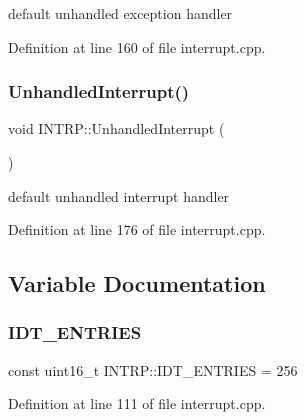 default unhandled exception handler 



Definition at line 160 of file interrupt.\+cpp.

\mbox{\label{namespace_i_n_t_r_p_a13c03019c9d7b305743516310096a82a}} 
\subsubsection{\texorpdfstring{Unhandled\+Interrupt()}{UnhandledInterrupt()}}
{\footnotesize\ttfamily void I\+N\+T\+R\+P\+::\+Unhandled\+Interrupt (\begin{DoxyParamCaption}{ }\end{DoxyParamCaption})}



default unhandled interrupt handler 



Definition at line 176 of file interrupt.\+cpp.



\subsection{Variable Documentation}
\mbox{\label{namespace_i_n_t_r_p_a1022b4dc1d9af1ea393f7f038ff421ce}} 
\subsubsection{\texorpdfstring{I\+D\+T\+\_\+\+E\+N\+T\+R\+I\+ES}{IDT\_ENTRIES}}
{\footnotesize\ttfamily const uint16\+\_\+t I\+N\+T\+R\+P\+::\+I\+D\+T\+\_\+\+E\+N\+T\+R\+I\+ES = 256}



Definition at line 111 of file interrupt.\+cpp.

